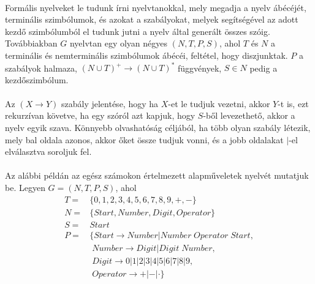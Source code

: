 \documentclass{elteikthesis}
\begin{document}
\paragraph{}
Formális nyelveket le tudunk írni nyelvtanokkal, mely megadja a nyelv ábécéjét, terminális szimbólumok, és azokat a szabályokat, melyek segítségével az adott kezdő szimbólumból el tudunk jutni a nyelv által generált összes szóig. Továbbiakban $G$ nyelvtan egy olyan négyes $(N, T, P, S)$, ahol $T$ és $N$ a terminális és nemterminális szimbólumok ábécéi, feltétel, hogy diszjunktak. $P$ a szabályok halmaza, $(N \cup T)^+ \rightarrow (N \cup T)^*$ függvények, $S \in N$ pedig a kezdőszimbólum.
\paragraph{}
Az $(X \rightarrow Y)$ szabály jelentése, hogy ha $X$-et le tudjuk vezetni, akkor $Y$-t is, ezt rekurzívan követve, ha egy szóról azt kapjuk, hogy $S$-ből levezethető, akkor a nyelv egyik szava. Könnyebb olvashatóság céljából, ha több olyan szabály létezik, mely bal oldala azonos, akkor őket össze tudjuk vonni, és a jobb oldalakat $|$-el elválasztva soroljuk fel.
\paragraph{}
Az alábbi példán az egész számokon értelmezett alapműveletek nyelvét mutatjuk be. Legyen $G=(N, T, P, S)$, ahol
$$
\begin{array}{rl}
T= & \{0, 1, 2, 3, 4, 5, 6, 7, 8, 9, +, -\} \\
N= & \{Start, Number, Digit, Operator\} \\
S= & Start \\
P= & \{Start \rightarrow Number | Number \; Operator \; Start, \\
&\; Number \rightarrow Digit | Digit \; Number, \\
&\; Digit \rightarrow 0 | 1 | 2 | 3 | 4 | 5 | 6 | 7 | 8 | 9, \\
&\; Operator \rightarrow + | -|\cdot\}
\end{array}
$$
\end{document}
